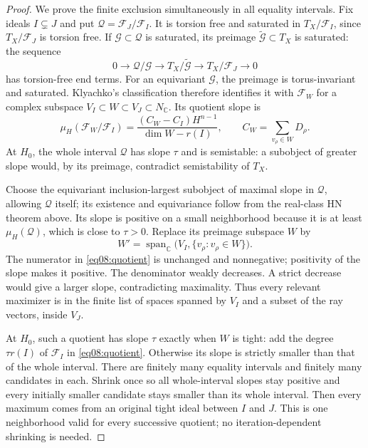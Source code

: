 \documentclass[11pt]{amsart}
\theoremstyle{definition}
\theoremstyle{remark}
\newcommand{\CC}{\mathbb C}
\newcommand{\spanC}{\operatorname{span}_{\CC}}
\begin{document}
\begin{proof}
We prove the finite exclusion simultaneously in all equality
intervals. Fix ideals \(I\subsetneq J\) and put
\(\mathcal Q=\mathcal F_J/\mathcal F_I\). It is torsion free and
saturated in \(T_X/\mathcal F_I\), since \(T_X/\mathcal F_J\)
is torsion free. If \(\mathcal G\subset\mathcal Q\) is saturated,
its preimage \(\widetilde{\mathcal G}\subset T_X\) is saturated:
the sequence
\begin{equation}\label{eq08:preimage}
 0\longrightarrow\mathcal Q/\mathcal G
 \longrightarrow T_X/\widetilde{\mathcal G}
 \longrightarrow T_X/\mathcal F_J\longrightarrow0
\end{equation}
has torsion-free end terms. For an equivariant \(\mathcal G\), the
preimage is torus-invariant and saturated. Klyachko's classification
\cite{klyachko1990} therefore identifies it with \(\mathcal F_W\)
for a complex subspace \(V_I\subset W\subset V_J\subset N_\CC\).
Its quotient slope is
\begin{equation}\label{eq08:quotient}
 \mu_H(\mathcal F_W/\mathcal F_I)
  =\frac{(C_W-C_I)H^{n-1}}{\dim W-r(I)},\qquad
 C_W=\sum_{v_\rho\in W}D_\rho.
\end{equation}
At \(H_0\), the whole interval \(\mathcal Q\) has slope \(\tau\)
and is semistable: a subobject of greater slope would, by its
preimage, contradict semistability of \(T_X\).

Choose the equivariant inclusion-largest subobject of maximal slope
in \(\mathcal Q\), allowing \(\mathcal Q\) itself; its existence
and equivariance follow from the real-class HN theorem above.
Its slope is positive on a small neighborhood because it is at least
\(\mu_H(\mathcal Q)\), which is close to \(\tau>0\). Replace
its preimage subspace \(W\) by
\[
 W'=\spanC\bigl(V_I,\{v_\rho:v_\rho\in W\}\bigr).
\]
The numerator in \eqref{eq08:quotient} is unchanged and
nonnegative; positivity of the slope makes it positive.
The denominator weakly decreases. A strict decrease would give a
larger slope, contradicting maximality. Thus every relevant
maximizer is in the finite list of spaces spanned by \(V_I\) and
a subset of the ray vectors, inside \(V_J\).

At \(H_0\), such a quotient has slope \(\tau\) exactly when
\(W\) is tight: add the degree \(\tau r(I)\) of \(\mathcal F_I\)
in \eqref{eq08:quotient}. Otherwise its slope is strictly smaller
than that of the whole interval. There are finitely many equality
intervals and finitely many candidates in each. Shrink once so all
whole-interval slopes stay positive and every initially smaller
candidate stays smaller than its whole interval. Then every maximum
comes from an original tight ideal between \(I\) and \(J\).
This is one neighborhood valid for every successive quotient; no
iteration-dependent shrinking is needed.


\end{proof}
\end{document}
